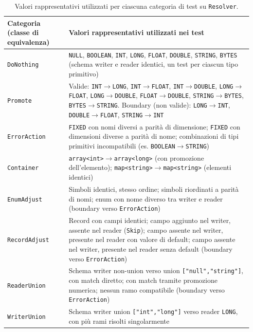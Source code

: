 \begin{table}[h]
\centering
\footnotesize
\begin{tabular}{@{}p{3cm}p{9.5cm}@{}}
\toprule
\textbf{Categoria (classe di equivalenza)} & \textbf{Valori rappresentativi utilizzati nei test} \\
\midrule
\texttt{DoNothing} & \texttt{NULL}, \texttt{BOOLEAN}, \texttt{INT}, \texttt{LONG}, \texttt{FLOAT}, \texttt{DOUBLE}, \texttt{STRING}, \texttt{BYTES} (schema writer e reader identici, un test per ciascun tipo primitivo) \\
\addlinespace
\texttt{Promote} & Valide: \texttt{INT}$\to$\texttt{LONG}, \texttt{INT}$\to$\texttt{FLOAT}, \texttt{INT}$\to$\texttt{DOUBLE}, \texttt{LONG}$\to$\texttt{FLOAT}, \texttt{LONG}$\to$\texttt{DOUBLE}, \texttt{FLOAT}$\to$\texttt{DOUBLE}, \texttt{STRING}$\to$\texttt{BYTES}, \texttt{BYTES}$\to$\texttt{STRING}. Boundary (non valide): \texttt{LONG}$\to$\texttt{INT}, \texttt{DOUBLE}$\to$\texttt{FLOAT}, \texttt{STRING}$\to$\texttt{INT} \\
\addlinespace
\texttt{ErrorAction} & \texttt{FIXED} con nomi diversi a parità di dimensione; \texttt{FIXED} con dimensioni diverse a parità di nome; combinazioni di tipi primitivi incompatibili (es. \texttt{BOOLEAN}$\to$\texttt{STRING}) \\
\addlinespace
\texttt{Container} & \texttt{array<int>}$\to$\texttt{array<long>} (con promozione dell'elemento); \texttt{map<string>}$\to$\texttt{map<string>} (elementi identici) \\
\addlinespace
\texttt{EnumAdjust} & Simboli identici, stesso ordine; simboli riordinati a parità di nomi; enum con nome diverso tra writer e reader (boundary verso \texttt{ErrorAction}) \\
\addlinespace
\texttt{RecordAdjust} & Record con campi identici; campo aggiunto nel writer, assente nel reader (\texttt{Skip}); campo assente nel writer, presente nel reader con valore di default; campo assente nel writer, presente nel reader senza default (boundary verso \texttt{ErrorAction}) \\
\addlinespace
\texttt{ReaderUnion} & Schema writer non-union verso union \texttt{["null","string"]}, con match diretto; con match tramite promozione numerica; nessun ramo compatibile (boundary verso \texttt{ErrorAction}) \\
\addlinespace
\texttt{WriterUnion} & Schema writer union \texttt{["int","long"]} verso reader \texttt{LONG}, con più rami risolti singolarmente \\
\bottomrule
\end{tabular}
\caption{Valori rappresentativi utilizzati per ciascuna categoria di test su \texttt{Resolver}.}
\label{tab:resolver-boundary-values}
\end{table}

